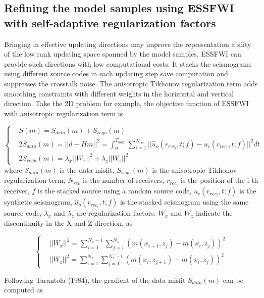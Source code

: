 \documentclass[mreferee]{gji}
\begin{document}
\subsection{Refining the model samples using ESSFWI with self-adaptive regularization factors}

Bringing in effective updating directions may improve the representation ability of the low rank updating space spanned by the model samples. ESSFWI can provide such directions with low computational costs. It stacks the seismograms using different source codes in each updating step save computation and suppresses the crosstalk noise. The anisotropic Tikhonov regularization term adds smoothing constraints with different weights in the horizontal and vertical direction. Take the 2D problem for example, the objective function of ESSFWI with anisotropic regularization term is

\begin{equation}
\left\{
\begin{aligned}
& S(m)=S_{data}(m)+S_{regu}(m) \\
& 2S_{data}(m)=||d-Hm||^2=\int_{0}^{T_{max}}\sum_{i=1}^{N_{rec}}||\hat u_o(r_{rec_i},t;f)-u_c(r_{rec_i},t;f)||^2dt \\
& 2S_{regu}(m)=\lambda_x||W_x||^2+\lambda_z||W_z||^2
\end{aligned}
\right.
\end{equation}
where $S_{data}(m)$ is the data misfit, $S_{regu}(m)$ is the anisotropic Tikhonov regularization term, $N_{rec}$ is the number of receivers, $r_{rec_i}$ is the position of the i-th receiver, $f$ is the stacked source using a random source code, $u_c(r_{rec_i},t;f)$ is the synthetic seismogram, $\hat u_o(r_{rec_i},t;f)$ is the stacked seismogram using the same source code, $\lambda_x$ and $\lambda_z$ are regularization factors. $W_x$ and $W_z$ indicate the discontinuity in the X and Z direction, as

\begin{equation}
\left\{
\begin{aligned}
& ||W_x||^2=\sum_{i=1}^{N_x-1}\sum_{j=1}^{N_z}\left(m(x_{i+1},z_j)-m(x_i,z_j)\right)^2 \\
& ||W_z||^2=\sum_{i=1}^{N_x}\sum_{j=1}^{N_z-1}\left(m(x_i,z_{j+1})-m(x_i,z_j)\right)^2
\end{aligned}
\right.
\end{equation}

Following Tarantola (1984), the gradient of the data misfit $S_{data}(m)$ can be computed as
\end{document}
